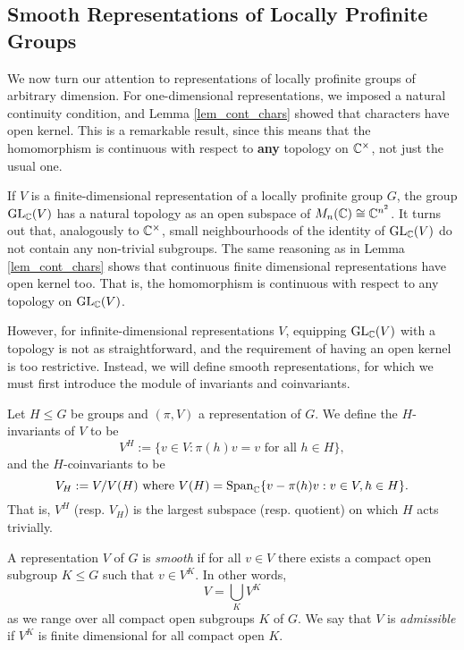 \subsection{Smooth Representations of Locally Profinite Groups}

We now turn our attention to representations of locally profinite groups of arbitrary dimension. For one-dimensional representations, we imposed a natural continuity condition, and Lemma \ref{lem_cont_chars} showed that characters have open kernel. This is a remarkable result, since this means that the homomorphism is continuous with respect to \textbf{any} topology on $\mathbb{C}^{\times}$, not just the usual one.

If $V$ is a finite-dimensional representation of a locally profinite group $G$, the group $\mathrm{GL}_{\mathbb{C}}(V)$ has a natural topology as an open subspace of $M_n(\mathbb{C})\cong\mathbb{C}^{n^2}$. It turns out that, analogously to $\mathbb{C}^{\times}$, small neighbourhoods of the identity of $\mathrm{GL}_{\mathbb{C}}(V)$ do not contain any non-trivial subgroups. The same reasoning as in Lemma \ref{lem_cont_chars} shows that continuous finite dimensional representations have open kernel too. That is, the homomorphism is continuous with respect to any topology on $\mathrm{GL}_{\mathbb{C}}(V)$.

However, for infinite-dimensional representations $V$, equipping $\mathrm{GL}_{\mathbb{C}}(V)$ with a topology is not as straightforward, and the requirement of having an open kernel is too restrictive. Instead, we will define smooth representations, for which we must first introduce the module of invariants and coinvariants.

\begin{defn}
    Let $H\leq G$ be groups and $(\pi,V)$ a representation of $G$. We define the $H$-invariants of $V$ to be 
    $$V^{H}:=\{v\in V:\pi(h)v=v\text{ for all }h\in H\},$$
    and the $H$-coinvariants to be 
    $$V_H:=V/V(H)\text{ where } V(H)=\textrm{Span}_{\mathbb{C}}\{v-\pi(h)v:v\in V,h\in H\}.$$
    That is, $V^H$ (resp. $V_H$) is the largest subspace (resp. quotient) on which $H$ acts trivially.
\end{defn}


\begin{defn}
	A representation $V$ of $G$ is \textit{smooth} if for all $v\in V$ there exists a compact open subgroup $K\leq G$ such that $v\in V^K$. In other words,
    $$V=\bigcup_K V^K$$ as we range over all compact open subgroups $K$ of $G$. We say that $V$ is \textit{admissible} if $V^K$ is finite dimensional for all compact open $K$.
\end{defn}

